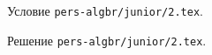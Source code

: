 \problem
Условие \texttt{pers-algbr/junior/2.tex}.

\solution Решение \texttt{pers-algbr/junior/2.tex}.
\endproblem
